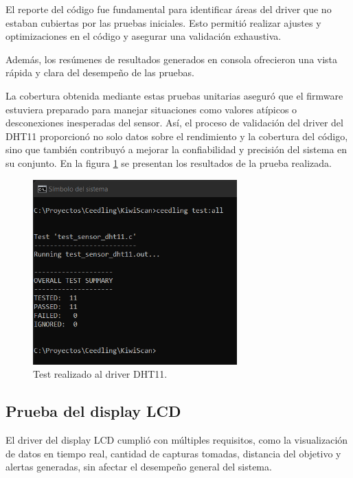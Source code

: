 El reporte del código fue fundamental para identificar áreas del driver que no estaban cubiertas por las pruebas iniciales. Esto permitió realizar ajustes y optimizaciones en el código y asegurar una validación exhaustiva. 

Además, los resúmenes de resultados generados en consola ofrecieron una vista rápida y clara del desempeño de las pruebas.

\newpage

La cobertura obtenida mediante estas pruebas unitarias aseguró que el firmware estuviera preparado para manejar situaciones como valores atípicos o desconexiones inesperadas del sensor. Así, el proceso de validación del driver del DHT11 proporcionó no solo datos sobre el rendimiento y la cobertura del código, sino que también contribuyó a mejorar la confiabilidad y precisión del sistema en su conjunto. En la figura \ref{fig:test_sensor_dht11} se presentan los resultados de la prueba realizada.

\vspace{1cm}

\begin{figure}[htbp]
	\centering
	\includegraphics[width=0.7\textwidth, height=0.3\textheight]{./Figures/test_sensor_dht11.png}
	\caption{Test realizado al driver DHT11.}
	\label{fig:test_sensor_dht11}
\end{figure}

\vspace{1cm}

\subsection{Prueba del display LCD}

El driver del display LCD cumplió con múltiples requisitos, como la visualización de datos en tiempo real, cantidad de capturas tomadas, distancia del objetivo y alertas generadas, sin afectar el desempeño general del sistema. 

